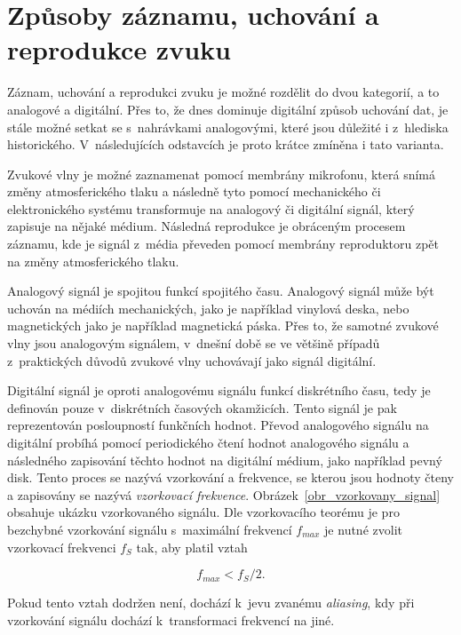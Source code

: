 \section{Způsoby záznamu, uchování a reprodukce zvuku}
\label{zpusoby_zaznamu_uchovani_a_reprodukce_zvuku}
Záznam, uchování a reprodukci zvuku je možné rozdělit do dvou kategorií, a to analogové a digitální. Přes to, že dnes dominuje digitální způsob uchování dat, je stále možné setkat se s~nahrávkami analogovými, které jsou důležité i z~hlediska historického. V~následujících odstavcích je proto krátce zmíněna i tato varianta.\cite{dsp}\cite{aca}

Zvukové vlny je možné zaznamenat pomocí membrány mikrofonu, která snímá změny atmosferického tlaku a následně tyto pomocí mechanického či elektronického systému transformuje na analogový či digitální signál, který zapisuje na nějaké médium. Následná reprodukce je obráceným procesem záznamu, kde je signál z~média převeden pomocí membrány reproduktoru zpět na změny atmosferického tlaku.\cite{dsp}\cite{aca}

Analogový signál je spojitou funkcí spojitého času. Analogový signál může být uchován na médiích mechanických, jako je například vinylová deska, nebo magnetických jako je například magnetická páska. Přes to, že samotné zvukové vlny jsou analogovým signálem, v~dnešní době se ve většině případů z~praktických důvodů zvukové vlny uchovávají jako signál digitální.\cite{dsp}\cite{aca}

Digitální signál je oproti analogovému signálu funkcí diskrétního času, tedy je definován pouze v~diskrétních časových okamžicích. Tento signál je pak reprezentován posloupností funkčních hodnot. Převod analogového signálu na digitální probíhá pomocí periodického čtení hodnot analogového signálu a následného zapisování těchto hodnot na digitální médium, jako například pevný disk. Tento proces se nazývá vzorkování a frekvence, se kterou jsou hodnoty čteny a zapisovány se nazývá \textit{vzorkovací frekvence}. Obrázek~\ref{obr_vzorkovany_signal} obsahuje ukázku vzorkovaného signálu. Dle vzorkovacího teorému je pro bezchybné vzorkování signálu s~maximální frekvencí $f_{max}$ je nutné zvolit vzorkovací frekvenci $f_S$ tak, aby platil vztah

\begin{equation}
	f_{max} < f_S/2.
\end{equation}
\medskip

\noindent Pokud tento vztah dodržen není, dochází k~jevu zvanému \textit{aliasing}, kdy při vzorkování signálu dochází k~transformaci frekvencí na jiné.\cite{dsp}\cite{aca}

